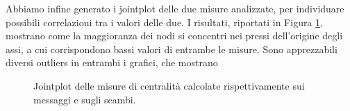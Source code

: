 Abbiamo infine generato i jointplot delle due misure analizzate, per individuare possibili correlazioni tra i valori delle due. I risultati, riportati in Figura \ref{fig:joint_centrality}, mostrano come la maggioranza dei nodi si concentri nei pressi dell'origine degli assi, a cui corrispondono bassi valori di entrambe le misure. Sono apprezzabili diversi outliers in entrambi i grafici, che mostrano 
\begin{figure}
	\hfill
	\caption{Jointplot delle misure di centralità calcolate rispettivamente sui messaggi e sugli scambi.}
	\label{fig:joint_centrality}
\end{figure}


